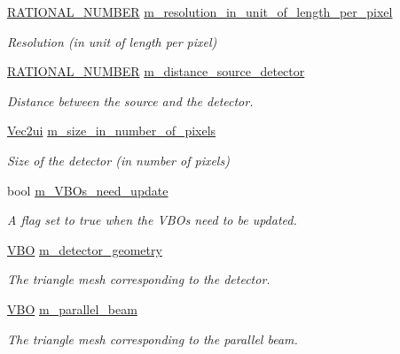 \begin{DoxyCompactItemize}
\hyperlink{namespace_utilities_a40969b96bd8d847b962e297cb79f08ce}{RATIONAL\_\-NUMBER} \hyperlink{classg_virtual_x_ray_1_1_x_ray_detector_a437004cdae0f0b03840c0dce2a0018d0}{m\_\-resolution\_\-in\_\-unit\_\-of\_\-length\_\-per\_\-pixel}
\begin{DoxyCompactList}\small\item\em Resolution (in unit of length per pixel) \end{DoxyCompactList}\item 
\hyperlink{namespace_utilities_a40969b96bd8d847b962e297cb79f08ce}{RATIONAL\_\-NUMBER} \hyperlink{classg_virtual_x_ray_1_1_x_ray_detector_a3b6ebd87b12d0fb434671309d252a00c}{m\_\-distance\_\-source\_\-detector}
\begin{DoxyCompactList}\small\item\em Distance between the source and the detector. \end{DoxyCompactList}\item 
\hyperlink{class_math_1_1_vec2}{Vec2ui} \hyperlink{classg_virtual_x_ray_1_1_x_ray_detector_a07c8671a6c02fb8b99e4b7c5d23cb8cf}{m\_\-size\_\-in\_\-number\_\-of\_\-pixels}
\begin{DoxyCompactList}\small\item\em Size of the detector (in number of pixels) \end{DoxyCompactList}\item 
bool \hyperlink{classg_virtual_x_ray_1_1_x_ray_detector_a69d92de8630dfb70270b914a4b3459a9}{m\_\-VBOs\_\-need\_\-update}
\begin{DoxyCompactList}\small\item\em A flag set to true when the VBOs need to be updated. \end{DoxyCompactList}\item 
\hyperlink{class_graphics_1_1_v_b_o}{VBO} \hyperlink{classg_virtual_x_ray_1_1_x_ray_detector_a2090842d641ea37cc03fd7da384c8c67}{m\_\-detector\_\-geometry}
\begin{DoxyCompactList}\small\item\em The triangle mesh corresponding to the detector. \end{DoxyCompactList}\item 
\hyperlink{class_graphics_1_1_v_b_o}{VBO} \hyperlink{classg_virtual_x_ray_1_1_x_ray_detector_af532ddbb920e88e98976704e56a103bb}{m\_\-parallel\_\-beam}
\begin{DoxyCompactList}\small\item\em The triangle mesh corresponding to the parallel beam. \end{DoxyCompactList}\item 

\end{DoxyCompactItemize}
